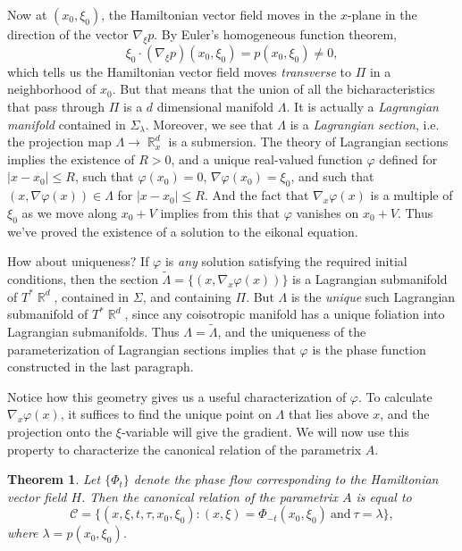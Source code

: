 \documentclass{article}
\theoremstyle{plain}
\newtheorem{theorem}{Theorem}
\theoremstyle{remark}
\theoremstyle{definition}
\DeclareMathOperator{\RR}{\mathbb{R}}
\begin{document}
Now at $(x_0,\xi_0)$, the Hamiltonian vector field moves in the $x$-plane in the direction of the vector $\nabla_\xi p$. By Euler's homogeneous function theorem,
%
\[ \xi_0 \cdot (\nabla_\xi p)(x_0,\xi_0) = p(x_0,\xi_0) \neq 0, \]
%
which tells us the Hamiltonian vector field moves \emph{transverse} to $\Pi$ in a neighborhood of $x_0$. But that means that the union of all the bicharacteristics that pass through $\Pi$ is a $d$ dimensional manifold $\Lambda$. It is actually a \emph{Lagrangian manifold} contained in $\Sigma_\lambda$. Moreover, we see that $\Lambda$ is a \emph{Lagrangian section}, i.e. the projection map $\Lambda \to \RR^d_x$ is a submersion. The theory of Lagrangian sections implies the existence of $R > 0$, and a unique real-valued function $\varphi$ defined for $|x - x_0| \leq R$, such that $\varphi(x_0) = 0$, $\nabla \varphi(x_0) = \xi_0$, and such that $(x,\nabla \varphi(x)) \in \Lambda$ for $|x - x_0| \leq R$. And the fact that $\nabla_x \varphi(x)$ is a multiple of $\xi_0$ as we move along $x_0 + V$ implies from this that $\varphi$ vanishes on $x_0 + V$. Thus we've proved the existence of a solution to the eikonal equation.

How about uniqueness? If $\varphi$ is \emph{any} solution satisfying the required initial conditions, then the section $\tilde{\Lambda} = \{ (x, \nabla_x \varphi(x)) \}$ is a Lagrangian submanifold of $T^* \RR^d$, contained in $\Sigma$, and containing $\Pi$. But $\Lambda$ is the \emph{unique} such Lagrangian submanifold of $T^* \RR^d$, since any coisotropic manifold has a unique foliation into Lagrangian submanifolds. Thus $\Lambda = \tilde{\Lambda}$, and the uniqueness of the parameterization of Lagrangian sections implies that $\varphi$ is the phase function constructed in the last paragraph.

Notice how this geometry gives us a useful characterization of $\varphi$. To calculate $\nabla_x \varphi(x)$, it suffices to find the unique point on $\Lambda$ that lies above $x$, and the projection onto the $\xi$-variable will give the gradient. We will now use this property to characterize the canonical relation of the parametrix $A$.

\begin{theorem}
	Let $\{ \Phi_t \}$ denote the phase flow corresponding to the Hamiltonian vector field $H$. Then the canonical relation of the parametrix $A$ is equal to
	\[ \mathcal{C} = \Big\{ (x,\xi,t,\tau,x_0,\xi_0) : (x,\xi) = \Phi_{-t}(x_0,\xi_0)\ \text{and}\ \tau = \lambda \Big\}, \]
	where $\lambda = p(x_0,\xi_0)$.
\end{theorem}
\end{document}
